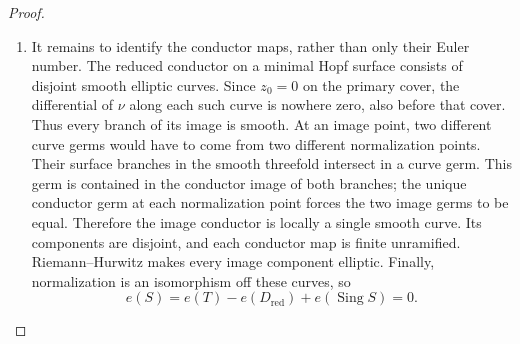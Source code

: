 \begin{proof}
\begin{enumerate}[label={$\langle1\rangle$\arabic*.},leftmargin=*]
\item It remains to identify the conductor maps,
rather than only their Euler number.
The reduced conductor on a minimal Hopf
surface consists of disjoint smooth elliptic
curves. Since $z_0=0$ on the primary cover,
the differential of $\nu$ along each such
curve is nowhere zero, also before that
cover. Thus every branch of its image is
smooth. At an image point, two different
curve germs would have to come from two
different normalization points. Their
surface branches in the smooth threefold
intersect in a curve germ. This germ is
contained in the conductor image of both
branches; the unique conductor germ at
each normalization point forces the two
image germs to be equal. Therefore the
image conductor is locally a single smooth
curve. Its components are disjoint, and
each conductor map is finite unramified.
Riemann--Hurwitz makes every image component
elliptic. Finally, normalization is an
isomorphism off these curves, so
\[
 e(S)=e(T)-e(D_{\mathrm{red}})
                 +e(\operatorname{Sing}S)=0.
\]

\end{enumerate}
\end{proof}
